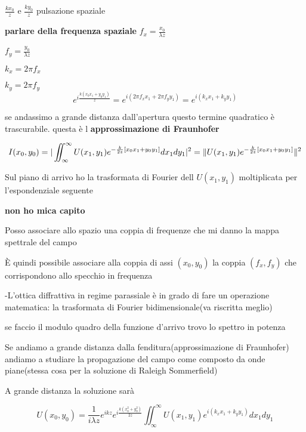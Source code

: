 \documentclass{article}
\DeclarePairedDelimiter\norm{\lVert}{\rVert}%
\begin{document}
$\frac{k x_{0}}{z}$ e $\frac{k y_{0}}{z}$ pulsazione spaziale


\textbf{parlare della frequenza spaziale}
$f_{x} = \frac{x_{0}}{\lambda z} $

$f_{y} = \frac{y_{0}}{\lambda z} $

$k_{x} = 2 \pi f_{x}$

$k_{y} = 2 \pi f_{y}$
\begin{equation}
e^{i \frac{k (x_{0} x_{1} + y_{0} y_{1})}{z} } = e^{i (2 \pi f_{x} x_{1} + 2 \pi f_{y} y_{1}) } = e^{i (k_{x} x_{1} + k_{y} y_{1}) }
\end{equation}


se andassimo a grande distanza dall'apertura questo termine quadratico è trascurabile. questa è l \textbf{approssimazione di Fraunhofer}

\begin{equation}
I(x_{0}, y_{0}) = |\iint_{\infty}^{\infty} U(x_{1}, y_{1}) e^{-\frac{k}{2z} [x_{0} x_{1} + y_{0} y_{1}]}dx_{1}dy_{1}|^{2} = \norm{U(x_{1}, y_{1}) e^{-\frac{k}{2z} [x_{0} x_{1} + y_{0} y_{1}]}} ^{2}
\end{equation}


Sul piano di arrivo ho la trasformata di Fourier dell $U(x_{1}, y_{1})$ moltiplicata per l'espondenziale seguente 

\textbf{non ho mica capito}

Posso associare allo spazio una coppia di frequenze che mi danno la mappa spettrale del campo

È quindi possibile associare alla coppia di assi $(x_{0}, y_{0})$ la coppia $(f_{x}, f_{y})$ che corrispondono allo specchio in frequenza 

-L'ottica diffrattiva in regime parassiale è in grado di fare un operazione matematica: la trasformata di Fourier bidimensionale(va riscritta meglio)

se faccio il modulo quadro della funzione d'arrivo trovo lo spettro in potenza

Se andiamo a grande distanza dalla fenditura(approssimazione di Fraunhofer) andiamo a studiare la propagazione del campo come composto da onde piane(stessa cosa per la soluzione di Raleigh Sommerfield)

A grande distanza la soluzione sarà

\begin{equation}
U(x_{0}, y_{0})= \frac{1}{i \lambda z} e^{i k z} e^{i \frac{k (x_{0} ^ {2} + y_{0}^{2})}{2 z}}  \iint_{\infty}^{\infty} U(x_{1}, y_{1}) e^{i (k_{x} x_{1} + k_{y} y_{1}) } dx_{1}dy_{1}
\end{equation}
\end{document}

